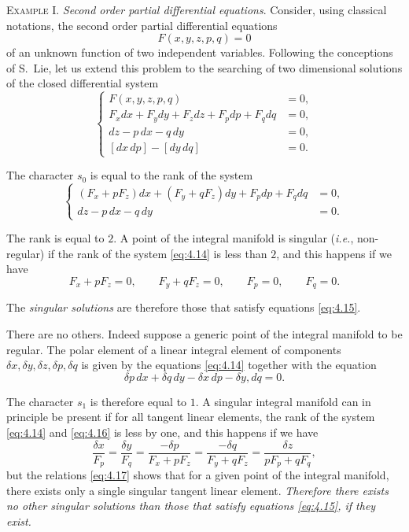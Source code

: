 \vspace{12pt}\fsec \textsc{Example I.} \emph{Second order partial differential equations}. Consider, using classical notations, the second order partial differential equations
\[
F(x,y,z,p,q)=0
\]
of an unknown function of two independent variables. Following the conceptions of S.~Lie, let us extend this problem to the searching of two dimensional solutions of the closed differential system
\begin{equation}
  \label{eq:4.13}
  \left\{
    \begin{aligned}
      F(x,y,z,p,q)&=0,\\
      F_{x}dx+F_{y}dy+F_{z}dz+F_{p}dp+F_{q}dq&=0,\\
      dz-p\,dx-q\,dy&=0,\\
      [dx\,dp]-[dy\,dq]&=0.
    \end{aligned}
\right.
\end{equation}

The character $s_{0}$ is equal to the rank of the system
\begin{equation}
  \label{eq:4.14}
  \left\{
    \begin{aligned}
      (F_{x}+pF_{z})dx+(F_{y}+qF_{z})dy+F_{p}dp+F_{q}dq&=0,\\
      dz-p\,dx-q\,dy&=0.
    \end{aligned}
  \right.
\end{equation}

The rank is equal to $2$. A point of the integral manifold is singular (\emph{i.e.}, non-regular) if the rank of the system \eqref{eq:4.14} is less than $2$, and this happens if we have
\begin{equation}
  \label{eq:4.15}
  F_{x}+pF_{z}=0,\qquad F_{y}+qF_{z}=0,\qquad F_{p}=0,\qquad F_{q}=0.
\end{equation}

The \emph{singular solutions} are therefore those that satisfy equations \eqref{eq:4.15}.

There are no others. Indeed suppose a generic point of the integral manifold to be regular. The polar element of a linear integral element of components $\delta x,\delta y, \delta z, \delta p, \delta q$ is given by the equations \eqref{eq:4.14} together with the equation
\begin{equation}
  \label{eq:4.16}
  \delta p\,dx+\delta q\,dy-\delta x\,dp-\delta y,dq=0.
\end{equation}

The character $s_{1}$ is therefore equal to $1$. A singular integral manifold can in principle be present  if for all tangent linear elements, the rank of the system \eqref{eq:4.14} and \eqref{eq:4.16} is less by one, and this happens if we have
\begin{equation}
  \label{eq:4.17}
  \frac{\delta x}{F_{p}}=\frac{\delta y}{F_{q}}=\frac{-\delta p}{F_{x}+pF_{z}}=\frac{-\delta q}{F_{y}+q F_{z}}=\frac{\delta z}{p F_{p}+qF_{q}},
\end{equation}
but the relations \eqref{eq:4.17} shows that for a given point of the integral manifold, there exists only a single singular tangent linear element. \emph{Therefore there exists no other singular solutions than those that satisfy equations \eqref{eq:4.15}, if they exist.}

